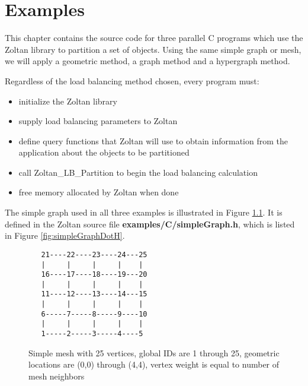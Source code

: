 %
%
\chapter{Examples}

This chapter contains the source code for three parallel C programs 
which use the Zoltan library to partition a set of objects.  Using
the same simple graph or mesh, we will apply a geometric method,
a graph method and a hypergraph method.

Regardless of the load balancing method chosen, every program must:

\begin{itemize}
\item initialize the Zoltan library
\item supply load balancing parameters to Zoltan
\item define query functions that Zoltan will use to obtain information from the application about the objects to be partitioned
\item call Zoltan\_LB\_Partition to begin the load balancing calculation
\item free memory allocated by Zoltan when done
\end{itemize}

The simple graph used in all three examples is illustrated
in Figure \ref{fig:simpleGraph}.
It is defined in the Zoltan source file \textbf{examples/C/simpleGraph.h},
which is listed in Figure \ref{fig:simpleGraphDotH}.

\begin{figure}[bottom]
\begin{center}
\begin{verbatim}
   21----22----23----24---25
   |     |     |     |    |
   16----17----18----19---20
   |     |     |     |    |
   11----12----13----14---15
   |     |     |     |    |
   6-----7-----8-----9----10
   |     |     |     |    |
   1-----2-----3-----4----5
\end{verbatim}
\caption{Simple mesh with 25 vertices, global IDs are 1 through 25, geometric locations are (0,0) through (4,4), vertex weight is equal to number of mesh neighbors}
\end{center}
\label{fig:simpleGraph}
\end{figure}

